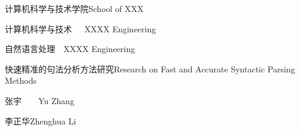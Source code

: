 
\school
{计算机科学与技术学院}{School of XXX}

\major
{计算机科学与技术~~~}{XXXX Engineering}

\direct
{自然语言处理~~}{XXXX Engineering}

\thesistitle
{快速精准的句法分析方法研究}{Research on Fast and Accurate Syntactic Parsing Methods}

\thesisauthor
{张宇~~~~}{Yu Zhang}

\teacher
{李正华}{Zhenghua Li}





